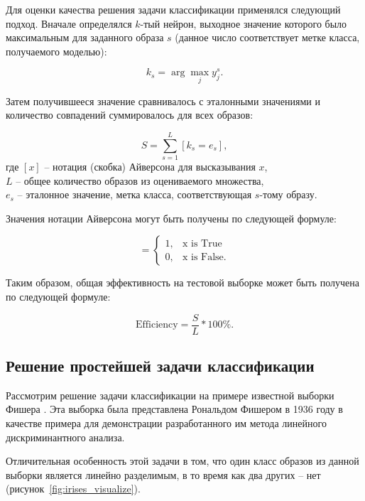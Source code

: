 Для оценки качества решения задачи классификации применялся следующий подход. Вначале определялся $k$-тый нейрон, выходное значение которого было максимальным для заданного образа $s$ (данное число соответствует метке класса, получаемого моделью):

\begin{equation}
  k_s = \arg \max_j y_j^s.
\end{equation}

Затем получившееся значение сравнивалось с эталонными значениями и количество совпадений суммировалось для всех образов:

\begin{equation}
  S = \sum_{s=1}^{L} [k_s = e_s],
\end{equation}
где $[x]$ -- нотация (скобка) Айверсона для высказывания $x$,\\
$L$ -- общее количество образов из оцениваемого множества,\\
$e_s$ -- эталонное значение, метка класса, соответствующая $s$-тому образу.

Значения нотации Айверсона могут быть получены по следующей формуле:

\begin{equation*}
    [x] = 
    \begin{cases}
        1, & \text{x is True} \\
        0, & \text{x is False}.
    \end{cases}
\end{equation*}

Таким образом, общая эффективность на тестовой выборке может быть получена по следующей формуле:

\begin{equation}
\text{Efficiency} = \frac{S}{L} * 100\%.
\end{equation}

\subsection{Решение простейшей задачи классификации}

Рассмотрим решение задачи классификации на примере известной выборки Фишера \cite[c.~180]{Fisher}. Эта выборка была представлена Рональдом Фишером в 1936 году в качестве примера для демонстрации разработанного им метода линейного дискриминантного анализа.

Отличительная особенность этой задачи в том, что один класс образов из данной выборки является линейно разделимым, в то время как два других -- нет (рисунок~\ref{fig:irises_visualize}).

